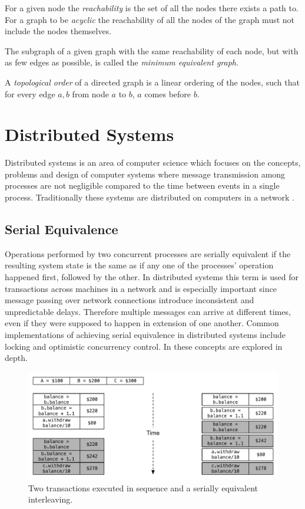 	For a given node the \textit{reachability} is the set of all the nodes there exists a path to. For a graph to be \textit{acyclic} the reachability of all the nodes of the graph must not include the nodes themselves. 
	
	The subgraph of a given graph with the same reachability of each node, but with as few edges as possible, is called the \textit{minimum equivalent graph}.
	
	A \textit{topological order} of a directed graph is a linear ordering of the nodes, such that for every edge $a,b$ from node $a$ to $b$, $a$ comes before $b$.
	

	\section{Distributed Systems}
		Distributed systems is an area of computer science which focuses on the concepts, problems and design of computer systems where message transmission among processes are not negligible compared to the time between events in a single process. Traditionally these systems are distributed on computers in a network \cite{Lamport:1978:TCO:359545.359563}.
		
		\subsection{Serial Equivalence}
		Operations performed by two concurrent processes are serially equivalent if the resulting system state is the same as if any one of the processes' operation happened first, followed by the other. In distributed systems this term is used for transactions across machines in a network and is especially important since message passing over network connections introduce inconsistent and unpredictable delays. Therefore multiple messages can arrive at different times, even if they were supposed to happen in extension of one another. Common implementations of achieving serial equivalence in distributed systems include locking and optimistic concurrency control. In \cite{Coulouris:2011:DSC:2029110:chapter16} these concepts are explored in depth.
		
		\begin{figure}[H]
		\centering
		\includegraphics[width=\textwidth]{2background/images/serial-equivalence.pdf}
		\caption{Two transactions executed in sequence and a serially equivalent interleaving.}
		\label{fig:background:serial-equivalence}
		\end{figure}
		
